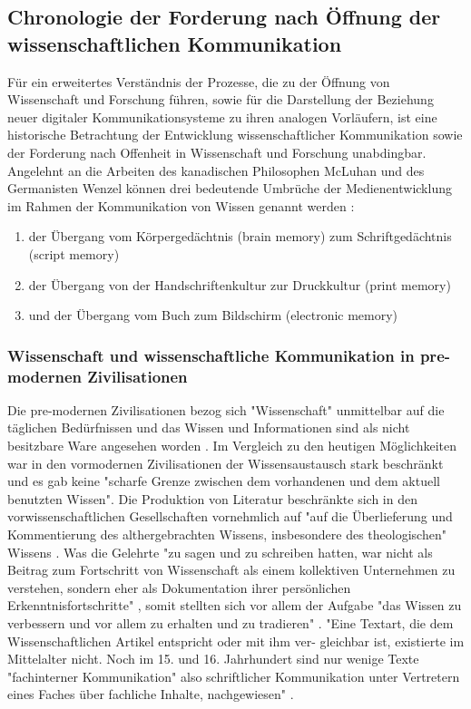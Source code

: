 \subsection{Chronologie der Forderung nach Öffnung der wissenschaftlichen Kommunikation}
Für ein erweitertes Verständnis der Prozesse, die zu der Öffnung von Wissenschaft und Forschung führen, sowie für die Darstellung der Beziehung neuer digitaler Kommunikationsysteme zu ihren analogen Vorläufern, ist eine historische Betrachtung der Entwicklung wissenschaftlicher Kommunikation sowie der Forderung nach Offenheit in Wissenschaft und Forschung unabdingbar. Angelehnt an die Arbeiten des kanadischen Philosophen McLuhan und des Germanisten Wenzel können drei bedeutende Umbrüche der Medienentwicklung im Rahmen der Kommunikation von Wissen \cite{wunderlich_2008_buchdruck} genannt werden  \cite{wenzel_mediengeschichte_2007}:
\begin{enumerate}
\item der Übergang vom Körpergedächtnis (brain memory) zum Schriftgedächtnis (script memory)
\item der Übergang von der Handschriftenkultur zur Druckkultur (print memory)
\item und der Übergang vom Buch zum Bildschirm (electronic memory)
\end{enumerate}

\subsubsection{Wissenschaft und wissenschaftliche Kommunikation in pre-modernen Zivilisationen}

Die pre-modernen Zivilisationen bezog sich "Wissenschaft" unmittelbar auf die täglichen Bedürfnissen und das Wissen und Informationen sind als nicht besitzbare Ware angesehen worden\cite{cite:18} \cite{steiner_1998_autorenhonorar}. Im Vergleich zu den heutigen Möglichkeiten war in den vormodernen Zivilisationen der Wissensaustausch stark beschränkt \cite{cite:17c} und es gab keine "scharfe Grenze zwischen dem vorhandenen und dem aktuell benutzten Wissen"\cite{Luhmann1998}. Die Produktion von Literatur beschränkte sich in den vorwissenschaftlichen Gesellschaften vornehmlich auf "auf die Überlieferung und Kommentierung des althergebrachten Wissens, insbesondere des theologischen" Wissens \cite{steiner_1998_autorenhonorar}. Was die Gelehrte "zu sagen und zu schreiben hatten, war nicht als Beitrag zum Fortschritt von Wissenschaft als einem kollektiven Unternehmen zu verstehen, sondern eher als Dokumentation ihrer persönlichen Erkenntnisfortschritte" \cite{graefen2007_wissenschaftliche_artikel}, somit stellten sich vor allem der Aufgabe "das Wissen zu verbessern und vor allem zu erhalten und zu tradieren" \cite{Luhmann1998}. "Eine Textart, die dem Wissenschaftlichen Artikel entspricht oder mit ihm ver- gleichbar ist, existierte im Mittelalter nicht. Noch im 15. und 16. Jahrhundert sind nur wenige Texte "fachinterner Kommunikation" also schriftlicher Kommunikation unter Vertretern eines Faches über fachliche Inhalte, nachgewiesen" \cite{graefen2007_wissenschaftliche_artikel}.

